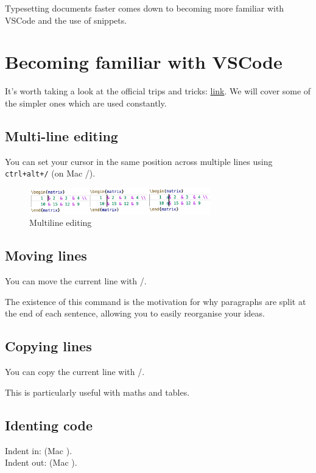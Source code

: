 Typesetting documents faster comes down to becoming more familiar with VSCode and the use of snippets.
\section{Becoming familiar with VSCode}
It's worth taking a look at the official trips and tricks: \href{https://code.visualstudio.com/docs/getstarted/tips-and-tricks}{link}.
We will cover some of the simpler ones which are used constantly.
\subsection{Multi-line editing}
You can set your cursor in the same position across multiple lines using
\texttt{ctrl+alt+\keys{\arrowkeyup}/\keys{\arrowkeydown}} (on Mac \keys{\cmd + \Alt + \arrowkeyup}/\keys{\arrowkeydown}).

\begin{figure}[h]
\centering
    \includegraphics[width=0.7\textwidth]{figures/multiline.png}
\caption{Multiline editing}
\end{figure}

\subsection{Moving lines}
You can move the current line with \keys{\Alt + \arrowkeyup}/\keys{\arrowkeydown}.

The existence of this command is the motivation for why paragraphs are split at the end of each sentence, allowing you to easily reorganise your ideas.

\subsection{Copying lines}
You can copy the current line with \keys{\shift + \Alt + \arrowkeyup}/\keys{\arrowkeydown}.

This is particularly useful with maths and tables.

\subsection{Identing code}
Indent in: \keys{\ctrl + ]} (Mac \keys{\cmd + ]}).\\
Indent out: \keys{\ctrl + [} (Mac \keys{\cmd + [}).
